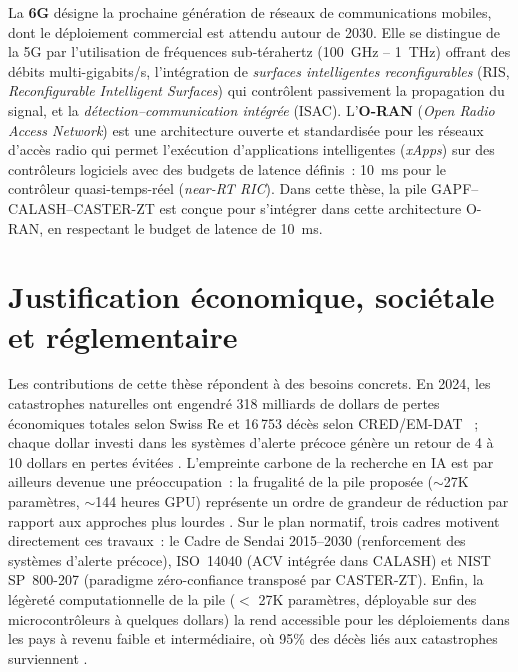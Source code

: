 La \textbf{6G} désigne la prochaine génération de réseaux de communications mobiles, dont le déploiement commercial est attendu autour de 2030. Elle se distingue de la 5G par l'utilisation de fréquences sub-térahertz (100~GHz -- 1~THz) offrant des débits multi-gigabits/s, l'intégration de \emph{surfaces intelligentes reconfigurables} (RIS, \emph{Reconfigurable Intelligent Surfaces}) qui contrôlent passivement la propagation du signal, et la \emph{détection--communication intégrée} (ISAC). L'\textbf{O-RAN} (\emph{Open Radio Access Network}) est une architecture ouverte et standardisée pour les réseaux d'accès radio qui permet l'exécution d'applications intelligentes (\emph{xApps}) sur des contrôleurs logiciels avec des budgets de latence définis~: 10~ms pour le contrôleur quasi-temps-réel (\emph{near-RT RIC}). Dans cette thèse, la pile GAPF--CALASH--CASTER-ZT est conçue pour s'intégrer dans cette architecture O-RAN, en respectant le budget de latence de 10~ms.


\section{Justification économique, sociétale et réglementaire}\label{sec:intro-justification}

Les contributions de cette thèse répondent à des besoins concrets. En 2024, les catastrophes naturelles ont engendré 318 milliards de dollars de pertes économiques totales selon Swiss Re \cite{swiss_re_2025} et 16\,753 décès selon CRED/EM-DAT \cite{cred_emdat_2025}~; chaque dollar investi dans les systèmes d'alerte précoce génère un retour de 4 à 10 dollars en pertes évitées \cite{UNDRR2015Sendai}. L'empreinte carbone de la recherche en IA est par ailleurs devenue une préoccupation~: la frugalité de la pile proposée ($\sim$27K paramètres, $\sim$144 heures GPU) représente un ordre de grandeur de réduction par rapport aux approches plus lourdes \cite{strubell2019energy}. Sur le plan normatif, trois cadres motivent directement ces travaux~: le Cadre de Sendai 2015--2030 \cite{UNDRR2015Sendai} (renforcement des systèmes d'alerte précoce), ISO~14040 \cite{iso14040} (ACV intégrée dans CALASH) et NIST SP~800-207 \cite{rose2020nist} (paradigme zéro-confiance transposé par CASTER-ZT). Enfin, la légèreté computationnelle de la pile ($<$ 27K paramètres, déployable sur des microcontrôleurs à quelques dollars) la rend accessible pour les déploiements dans les pays à revenu faible et intermédiaire, où 95\% des décès liés aux catastrophes surviennent \cite{IPCC2021AR6}.


